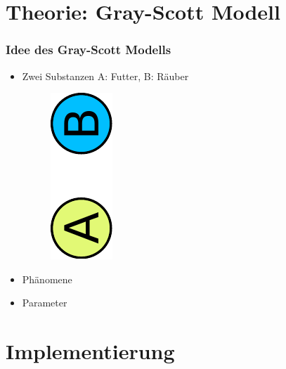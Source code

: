 \documentclass[aspectratio=32]{beamer}
\newcommand{\blob}{\rule[2.2pt]{3pt}{3pt}}
\newcommand{\sectionframe}{\begin{frame}
	\begin{center}
		\textcolor{simtechred}{\Large\insertsection}
	\end{center}
\end{frame}}
\newcommand{\reditem}{\item[\textcolor{simtechred}{$\blob$}]}
\begin{document}
\section{Theorie: Gray-Scott Modell}
\sectionframe

\begin{frame}
\frametitle{Idee des Gray-Scott Modells}
\begin{itemize}
  \reditem Zwei Substanzen A: Futter, B: Räuber
    \begin{figure}[H]
      \includegraphics[height=\textwidth/12,keepaspectratio,angle=-90,origin=c]{Bilder/substances.pdf}
    \end{figure}
  \reditem Phänomene
  
  \reditem Parameter
    \
    
\end{itemize}
\end{frame}

\section{Implementierung}
\sectionframe
\end{document}
